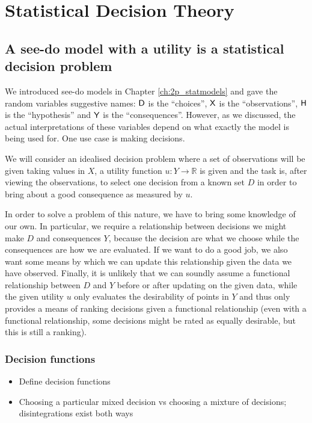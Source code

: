 
\chapter{Statistical Decision Theory}

\section{A see-do model with a utility is a statistical decision problem}

We introduced see-do models in Chapter \ref{ch:2p_statmodels} and gave the random variables suggestive names: $\mathsf{D}$ is the ``choices'', $\mathsf{X}$ is the ``observations'', $\mathsf{H}$ is the ``hypothesis'' and $\mathsf{Y}$ is the ``consequences''. However, as we discussed, the actual interpretations of these variables depend on what exactly the model is being used for. One use case is making decisions. 

We will consider an idealised decision problem where a set of observations will be given taking values in $X$, a utility function $u:Y\to \mathbb{R}$ is given and the task is, after viewing the observations, to select one decision from a known set $D$ in order to bring about a good consequence as measured by $u$.

In order to solve a problem of this nature, we have to bring some knowledge of our own. In particular, we require a relationship between decisions we might make $D$ and consequences $Y$, because the decision are what we choose while the consequences are how we are evaluated. If we want to do a good job, we also want some means by which we can update this relationship given the data we have observed. Finally, it is unlikely that we can soundly assume a functional relationship between $D$ and $Y$ before or after updating on the given data, while the given utility $u$ only evaluates the desirability of points in $Y$ and thus only provides a means of ranking decisions given a functional relationship (even with a functional relationship, some decisions might be rated as equally desirable, but this is still a ranking).


\subsection{Decision functions}

\begin{itemize}
    \item Define decision functions
    \item Choosing a particular mixed decision vs choosing a mixture of decisions; disintegrations exist both ways
\end{itemize}

